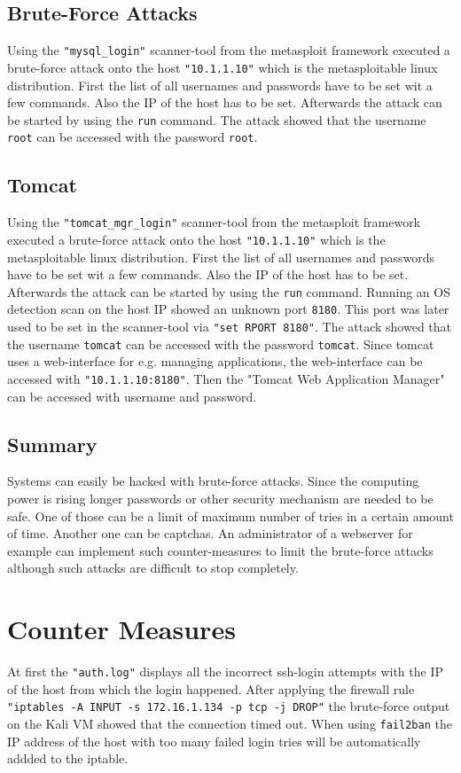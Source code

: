 \section{Brute-Force Attacks}

Using the \texttt{"mysql\_login"} scanner-tool from the metasploit framework executed a brute-force attack onto the host \texttt{"10.1.1.10"} which is the metasploitable linux distribution. First the list of all usernames and passwords have to be set wit a few commands. Also the \ac{IP} of the host has to be set. Afterwards the attack can be started by using the \texttt{run} command. The attack showed that the username \texttt{root} can be accessed with the password \texttt{root}.

\section{Tomcat}

Using the \texttt{"tomcat\_mgr\_login"} scanner-tool from the metasploit framework executed a brute-force attack onto the host \texttt{"10.1.1.10"} which is the metasploitable linux distribution. First the list of all usernames and passwords have to be set wit a few commands. Also the \ac{IP} of the host has to be set. Afterwards the attack can be started by using the \texttt{run} command. Running an OS detection scan on the host \ac{IP} showed an unknown port \texttt{8180}. This port was later used to be set in the scanner-tool via \texttt{"set RPORT 8180"}. The attack showed that the username \texttt{tomcat} can be accessed with the password \texttt{tomcat}. Since tomcat uses a web-interface for e.g. managing applications, the web-interface can be accessed with \texttt{"10.1.1.10:8180"}. Then the "Tomcat Web Application Manager" can be accessed with username and password.

\section{Summary}

Systems can easily be hacked with brute-force attacks. Since the computing power is rising longer passwords or other security mechanism are needed to be safe. One of those can be a limit of maximum number of tries in a certain amount of time. Another one can be captchas. An administrator of a webserver for example can implement such counter-measures to limit the brute-force attacks although such attacks are difficult to stop completely.

\chapter{Counter Measures}

At first the \texttt{"auth.log"} displays all the incorrect ssh-login attempts with the \ac{IP} of the host from which the login happened. After applying the firewall rule \texttt{"iptables -A INPUT -s 172.16.1.134 -p tcp -j DROP"} the brute-force output on the Kali VM showed that the connection timed out. When using \texttt{fail2ban} the \ac{IP} address of the host with too many failed login tries will be automatically addded to the iptable.